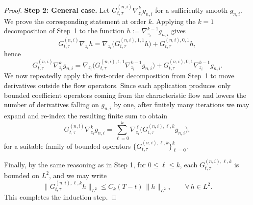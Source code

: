 \documentclass[10pt,a4paper]{amsart}
\begin{document}
\begin{proof}
\medskip
\noindent\textbf{Step 2: General case.}
Let $G^{(n,i)}_{t,\tau}\nabla_{z_i}^{k} g_{n,i}$ for a sufficiently smooth $g_{n,i}$. We prove the corresponding statement at order $k$.
Applying the $k=1$ decomposition of Step~1 to the function
$h:=\nabla_{z_i}^{k-1}g_{n,i}$ gives
\begin{equation}\label{eq:step1_applied_to_h}
G^{(n,i)}_{t,\tau}\nabla_{z_i}h
=
\nabla_{z_i}\big(G^{(n,i),1,1}_{t,\tau}h\big)
+
G^{(n,i),0,1}_{t,\tau}h,
\end{equation}
hence
\[
G^{(n,i)}_{t,\tau}\nabla_{z_i}^{k} g_{n,i}
=
\nabla_{z_i}\Big(G^{(n,i),1,1}_{t,\tau}\nabla_{z_i}^{k-1}g_{n,i}\Big)
+
G^{(n,i),0,1}_{t,\tau}\nabla_{z_i}^{k-1}g_{n,i}.
\]
We now repeatedly apply the first-order decomposition from Step~1 to move
derivatives outside the flow operators. Since each application produces only
bounded coefficient operators coming from the characteristic flow and lowers the
number of derivatives falling on $g_{n,i}$ by one, after finitely many iterations
we may expand and re-index the resulting finite sum to obtain
\[
G^{(n,i)}_{t,\tau}\nabla_{z_i}^{k} g_{n,i}
=
\sum_{\ell=0}^{k}
\nabla_{z_i}^{\,\ell}\big( G^{(n,i),\ell,k}_{t,\tau} g_{n,i}\big),
\]
for a suitable family of bounded operators
$\{G^{(n,i),\ell,k}_{t,\tau}\}_{\ell=0}^k$.

\noindent
Finally, by the same reasoning as in Step 1, for $0 \leq \ell \leq k$, each $G^{(n,i),\ell,k}_{t,\tau}$ is bounded
on $L^2$, and we may write
\[
\|G^{(n,i),\ell,k}_{t,\tau} h\|_{L^2}
\le C_k(T-t)\,\|h\|_{L^2},
\qquad \forall\, h\in L^2.
\]
This completes the induction step.
\end{proof}
\end{document}
